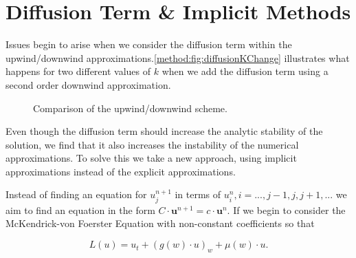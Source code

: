 \documentclass[../main.tex]{subfiles}
\begin{document}
  \section{Diffusion Term \& Implicit Methods}
  Issues begin to arise when we consider the diffusion term within the upwind/downwind approximations.\autoref{method:fig:diffusionKChange} illustrates what happens for two different values of $k$ when we add the diffusion term using a second order downwind approximation.

  \begin{figure}[htb]
    \centering
    \caption{\label{method:fig:diffusionKChange} Comparison of the upwind/downwind scheme.}
  \end{figure}

  Even though the diffusion term should increase the analytic stability of the solution, we find that it also increases the instability of the numerical approximations. To solve this we take a new approach, using implicit approximations instead of the explicit approximations.

  Instead of finding an equation for $u^{n+1}_j$ in terms of $u^n_i, i = ..., j-1, j, j+1, ... $ we aim to find an equation in the form $C \cdot \textbf{u}^{n+1} = c \cdot \textbf{u}^n$. If we begin to consider the McKendrick-von Foerster Equation with non-constant coefficients so that

  \begin{equation}
    L(u) = u_t + (g(w) \cdot u)_w + \mu(w) \cdot u.
  \end{equation}
\end{document}
